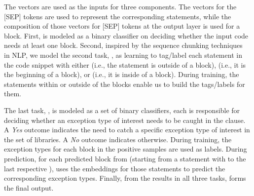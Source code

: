 

The vectors are used as the inputs for three components. The vectors
for the [SEP] tokens are used to represent the corresponding
statements, while the composition of those vectors for [SEP] tokens at
the output layer is used for a block.
%
First, {\xblock} is modeled as a binary classifier on deciding whether
the input code needs at least one  block. Second,
inspired by the sequence chunking
techniques~\cite{sequence-chunking-aaai17} in NLP, we model the second
task, {\xstate}, as learning to tag/label each statement in the code
snippet with either  (i.e., the statement is outside of a
 block),  (i.e., it is the beginning of a
 block), or  (i.e., it is inside of a 
block).
During training, the statements within or outside of the
 blocks enable us to build the tags/labels for them.

The last task, {\xtype}, is modeled as a set of binary classifiers,
each is responsible for deciding whether an exception type of interest
needs to be caught in the  clause. A {\em Yes} outcome
indicates the need to catch a specific exception type of interest in
the set of libraries. A {\em No} outcome indicates otherwise.  During
training, the exception types for each  block in the
positive samples are used as labels. During prediction, for each
predicted block from {\xstate} (starting from a statement with
 to the last respective ), {\xtype} uses the
embeddings for those statements to predict the corresponding exception
types. Finally, from the results in all three tasks, {\tool} forms the
final output.

